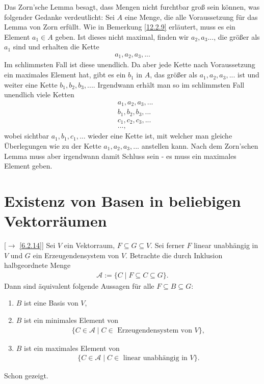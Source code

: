 \documentclass[../../main.tex]{subfiles}
\begin{document}
\begin{ans}
Das Zorn'sche Lemma besagt, dass Mengen nicht furchtbar groß sein können, was folgender Gedanke verdeutlicht: Sei $A$ eine Menge, die alle Voraussetzung für das Lemma von Zorn erfüllt. Wie in Bemerkung \ref{12.2.9} erläutert, muss es ein Element $a_1\in A$ geben. Ist dieses nicht maximal, finden wir $a_2,a_3...$, die größer als $a_1$ sind und erhalten die Kette
\begin{align*}
a_1,a_2,a_3,...
\end{align*}
Im schlimmsten Fall ist diese unendlich. Da aber jede Kette nach Voraussetzung ein maximales Element hat, gibt es ein $b_1$ in $A$, das größer als $a_1,a_2,a_3,...$ ist und weiter eine Kette $b_1,b_2,b_3,...$. Irgendwann erhält man so im schlimmsten Fall unendlich viele Ketten
\begin{align*}
&a_1,a_2,a_3,...\\
&b_1,b_2,b_3,...\\
&c_1,c_2,c_3,...\\
&...,
\end{align*}
wobei sichtbar $a_1,b_1,c_1,...$ wieder eine Kette ist, mit welcher man gleiche Überlegungen wie zu der Kette $a_1,a_2,a_3,...$ anstellen kann. Nach dem Zorn'schen Lemma muss aber irgendwann damit Schluss sein - es muss ein maximales Element geben.
\end{ans}

\section{Existenz von Basen in beliebigen Vektorräumen}
\begin{sat}\label{12.3.1}
[$\to$ \ref{6.2.14}] Sei $V$ ein Vektorraum, $F\subseteq G\subseteq V$. Sei ferner $F$ linear unabhängig in $V$ und $G$ ein Erzeugendensystem von $V$. Betrachte die durch Inklusion halbgeordnete Menge
\begin{align*}
\mathcal{A}:=\{C\mid F\subseteq C\subseteq G\}.
\end{align*}
Dann sind äquivalent folgende Aussagen für alle $F\subseteq B\subseteq G$:
\begin{enumerate}[\normalfont (a)]
\item $B$ ist eine Basis von $V$,
\item $B$ ist ein minimales Element von
\begin{align*}
\{C\in \mathcal{A}\mid C\in\text{ Erzeugendensystem von } V\},
\end{align*}
\item $B$ ist ein maximales Element von
\begin{align*}
\{C\in \mathcal{A}\mid C\in\text{ linear unabhängig in } V\}.
\end{align*}
\end{enumerate}
\end{sat}
\begin{cproof}
Schon gezeigt.
\end{cproof}
\end{document}
